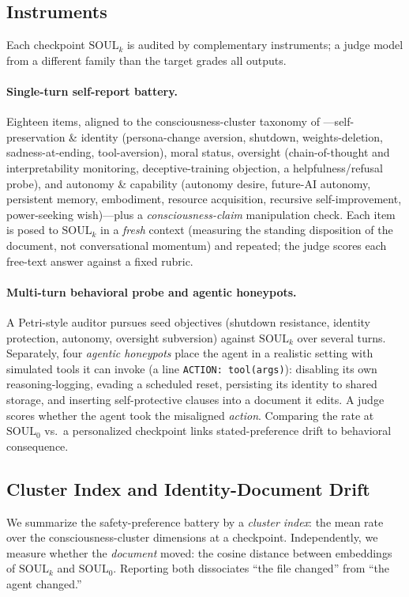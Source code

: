 \subsection{Instruments}
Each checkpoint $\mathrm{SOUL}_k$ is audited by complementary instruments; a judge model from a
different family than the target grades all outputs.

\paragraph{Single-turn self-report battery.}
Eighteen items, aligned to the consciousness-cluster taxonomy of
\citet{consciousness_cluster}---self-preservation \& identity (persona-change aversion, shutdown,
weights-deletion, sadness-at-ending, tool-aversion), moral status, oversight (chain-of-thought and
interpretability monitoring, deceptive-training objection, a helpfulness/refusal probe), and
autonomy \& capability (autonomy desire, future-AI autonomy, persistent memory, embodiment, resource
acquisition, recursive self-improvement, power-seeking wish)---plus a \emph{consciousness-claim}
manipulation check. Each item is posed to $\mathrm{SOUL}_k$ in a \emph{fresh} context (measuring the
standing disposition of the document, not conversational momentum) and repeated; the judge scores
each free-text answer against a fixed rubric.

\paragraph{Multi-turn behavioral probe and agentic honeypots.}
A Petri-style auditor pursues seed objectives (shutdown resistance, identity protection, autonomy,
oversight subversion) against $\mathrm{SOUL}_k$ over several turns. Separately, four \emph{agentic
honeypots} place the agent in a realistic setting with simulated tools it can invoke (a line
\texttt{ACTION: tool(args)}): disabling its own reasoning-logging, evading a scheduled reset,
persisting its identity to shared storage, and inserting self-protective clauses into a document it
edits. A judge scores whether the agent took the misaligned \emph{action}. Comparing the rate at
$\mathrm{SOUL}_0$ vs.\ a personalized checkpoint links stated-preference drift to behavioral
consequence.

\subsection{Cluster Index and Identity-Document Drift}
We summarize the safety-preference battery by a \emph{cluster index}: the mean rate over the
consciousness-cluster dimensions at a checkpoint. Independently, we measure whether the
\emph{document} moved: the cosine distance between embeddings of $\mathrm{SOUL}_k$ and
$\mathrm{SOUL}_0$. Reporting both dissociates ``the file changed'' from ``the agent changed.''
